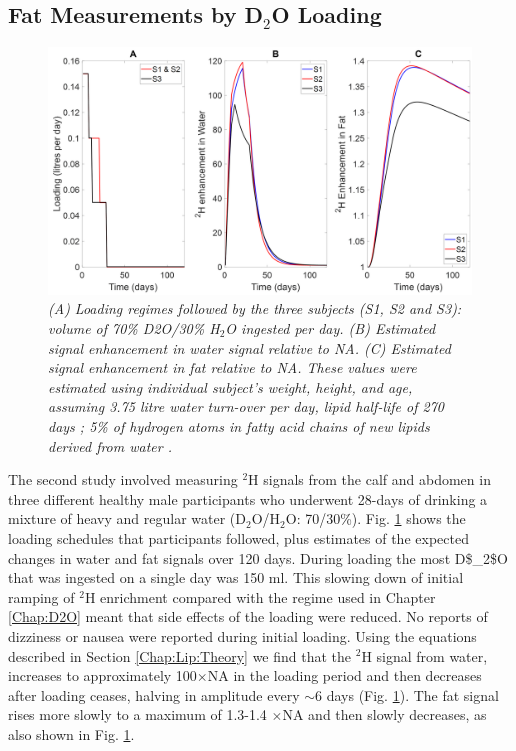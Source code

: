 \subsection{Fat Measurements by D$_2$O Loading}

\begin{figure}
    \centering
    \includegraphics[width=1\textwidth]{Figures/Lipid/Loading_Routine.png}
    \caption{\textit{(A) Loading regimes followed by the three subjects (S1, S2 and S3): volume of 70\% D2O/30\% H$_2$O ingested per day. (B) Estimated signal enhancement in water signal relative to NA. (C) Estimated signal enhancement in fat relative to NA. These values were estimated using individual subject’s weight, height, and age, assuming 3.75 litre water turn-over per day, lipid half-life of 270 days \cite{Arner2011DynamicsDisease, Spalding2017ImpactTissue}; 5\% of hydrogen atoms in fatty acid chains of new lipids derived from water \cite{Turner2003MeasurementMIDA}.}}
    \label{fig:Lip:Load}
\end{figure}

The second study involved measuring $^2$H signals from the calf and abdomen in three different healthy male participants who underwent 28-days of drinking a mixture of heavy and regular water (D$_2$O/H$_2$O: 70/30\%). Fig. \ref{fig:Lip:Load} shows the loading schedules that participants followed, plus estimates of the expected changes in water and fat signals over 120 days. During loading the most \ac{D$_2$O} that was ingested on a single day was 150 ml. This slowing down of initial ramping of $^2$H enrichment compared with the regime used in Chapter \ref{Chap:D2O} meant that side effects of the loading were reduced. No reports of dizziness or nausea were reported during initial loading. Using the equations described in Section \ref{Chap:Lip:Theory} we find that the $^2$H signal from water, increases to approximately 100$\times$\ac{NA} in the loading period and then decreases after loading ceases, halving in amplitude every $\sim$6 days (Fig. \ref{fig:Lip:Load}). The fat signal rises more slowly to a maximum of 1.3-1.4 $\times$\ac{NA} and then slowly decreases, as also shown in Fig. \ref{fig:Lip:Load}.

